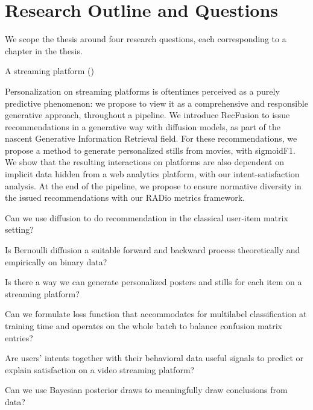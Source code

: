 
\section{Research Outline and Questions}
\label{section:introduction:rqs}


We scope the thesis around four research questions, each corresponding to a chapter in the thesis.

A streaming platform ()

Personalization on streaming platforms is oftentimes perceived as a purely predictive phenomenon: we propose to view it as a comprehensive and responsible generative approach, throughout a pipeline. We introduce RecFusion to issue recommendations in a generative way with diffusion models, as part of the nascent Generative Information Retrieval field. For these recommendations, we propose a method to generate personalized stills from movies, with sigmoidF1. We show that the resulting interactions on platforms are also dependent on implicit data hidden from a web analytics platform, with our intent-satisfaction analysis. At the end of the pipeline, we propose to ensure normative diversity in the issued recommendations with our RADio metrics framework.


\begin{question}
  Can we use diffusion to do recommendation in the classical user-item matrix setting?
\end{question}

Is Bernoulli diffusion a suitable forward and backward process theoretically and empirically on binary data?

\begin{question}
  Is there a way we can generate personalized posters and stills for each item on a streaming platform?
\end{question}

Can we formulate loss function that accommodates for multilabel classification at training time and operates on the whole batch to balance confusion matrix entries?

\begin{question}
  Are users' intents together with their behavioral data useful signals to predict or explain satisfaction on a video streaming platform?
\end{question}

Can we use Bayesian posterior draws to meaningfully draw conclusions from data?

